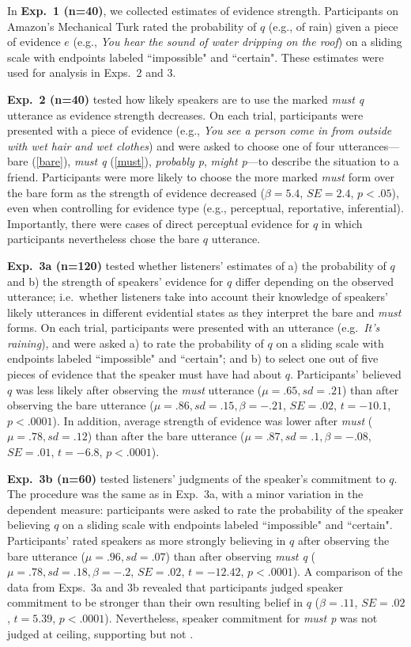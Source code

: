 \documentclass[11pt]{article}
\begin{document}
In \textbf{Exp.~1 (n=40)}, we collected estimates of evidence strength. Participants on Amazon's Mechanical Turk rated the probability of $q$ (e.g., of rain) given a piece of evidence $e$ (e.g., \emph{You hear the sound of water dripping on the roof}) on a sliding scale with endpoints labeled ``impossible" and ``certain". These estimates were used for analysis in Exps.~2 and 3.

\textbf{Exp.~2 (n=40)} tested how likely speakers are to use the marked \emph{must q} utterance as evidence strength decreases. On each trial, participants were presented with a piece of evidence (e.g., \emph{You see a person come in from outside with wet hair and wet clothes}) and were asked to choose one of four utterances---bare (\ref{bare}), \emph{must q} (\ref{must}), \emph{probably p}, \emph{might p}---to describe the situation to a friend. Participants were more likely to choose the more marked \emph{must} form over the bare form as the strength of evidence decreased ($\beta=5.4$, $SE=2.4$, $p<.05$), even when controlling for evidence type (e.g., perceptual, reportative, inferential). Importantly, there were cases of direct perceptual evidence for $q$ in which participants nevertheless chose the bare $q$ utterance.

\textbf{Exp.~3a (n=120)} tested whether listeners' estimates of a) the probability of $q$ and b) the strength of speakers' evidence for $q$ differ depending on the observed utterance; i.e.~whether listeners take into account their knowledge of speakers' likely utterances in different evidential states as they interpret the bare and \emph{must} forms. On each trial, participants were presented with an utterance (e.g.~\emph{It's raining}), and were asked a) to rate the probability of $q$ on a sliding scale with endpoints labeled ``impossible" and ``certain"; and b) to select one out of five pieces of evidence that the speaker must have had about $q$. Participants' believed $q$ was less likely after observing the \emph{must} utterance ($\mu=.65,sd=.21$) than after observing the bare utterance ($\mu=.86,sd=.15, \beta=-.21$, $SE=.02$, $t=-10.1$, $p<.0001$). In addition, average strength of evidence was lower after \emph{must} ($\mu=.78,sd=.12$) than after the bare utterance ($\mu=.87,sd=.1, \beta=-.08$, $SE=.01$, $t=-6.8$, $p<.0001$).

\textbf{Exp.~3b (n=60)} tested listeners' judgments of the speaker's commitment to $q$. The procedure was the same as in Exp.~3a, with a minor variation in the dependent measure: participants were asked to rate the probability of the speaker believing $q$ on a sliding scale with endpoints labeled ``impossible" and ``certain". Participants' rated speakers as more strongly believing in $q$ after observing the bare utterance ($\mu=.96,sd=.07$) than after observing  \emph{must q}  ($\mu=.78,sd=.18, \beta=-.2$, $SE=.02$, $t=-12.42$, $p<.0001$). A comparison of the data from Exps.~3a and 3b revealed that participants judged speaker commitment to be stronger than their own resulting belief in $q$ ($\beta=.11$, $SE=.02$, $t=5.39$, $p<.0001$). Nevertheless, speaker commitment for \emph{must p} was not judged at ceiling, supporting  but not .
\end{document}
